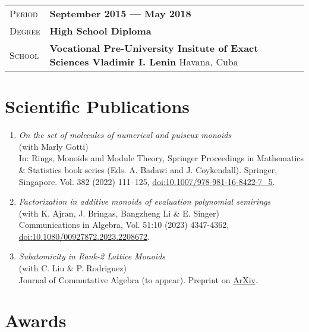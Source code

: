 \documentclass[12pt]{amsart}
\theoremstyle{definition}
\numberwithin{equation}{section}
\newcommand{\gray}{\rowcolor[gray]{.90}} %
\begin{document}
	\vspace{12pt}
	
	\begin{tabularx}{0.97\linewidth}{>{\raggedleft\scshape}p{2cm}X}
	\gray Period & \textbf{September 2015 --- May 2018}\\
	\gray Degree & \textbf{High School Diploma}\\
	\gray School & \textbf{Vocational Pre-University Insitute of Exact Sciences Vladimir I. Lenin} \hfill Havana, Cuba\\
	\end{tabularx}

	\section{Scientific Publications}
	
	\begin{enumerate}
		\item	\textit{On the set of molecules of numerical and puiseux monoids} \\(with Marly Gotti)\\ In: Rings, Monoids and Module Theory, Springer Proceedings in Mathematics \& Statistics book series (Eds. A. Badawi and J.
		Coykendall). Springer, Singapore. Vol. 382 (2022) 111–125, \href{https://doi.org/10.1007/978-981-16-8422-7_5}{doi:10.1007/978-981-16-8422-7\_5}.
		
		\item \textit{Factorization in additive monoids of evaluation polynomial semirings} \\ (with K. Ajran, J. Bringas, Bangzheng Li \& E. Singer) \\ Communications in Algebra, Vol. 51:10 (2023) 4347-4362, \href{https://doi.org/10.1080/00927872.2023.2208672}{doi:10.1080/00927872.2023.2208672}. 
		
		\item \textit{Subatomicity in Rank-2 Lattice Monoids} \\(with C. Liu \& P. Rodriguez)\\ Journal of Commutative Algebra (to appear). Preprint on \href{https://arxiv.org/abs/2308.01459}{ArXiv}. 
	\end{enumerate}

\section{Awards}
\end{document}
